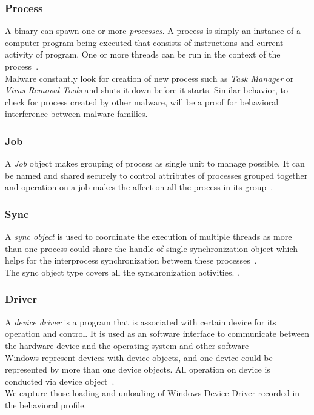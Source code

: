 \subsubsection{Process}
\label{ssub:Process}
A binary can spawn one or more \emph{processes}.
A process is simply an instance of a computer program being executed that consists of instructions and current activity of program.
One or more threads can be run in the context of the process~\cite[]{msprocess}.\\
Malware constantly look for creation of new process such as \emph{Task Manager} or \emph{Virus Removal Tools} and shuts it down before it starts.
Similar behavior, to check for process created by other malware, will be a proof for behavioral interference between malware families.
\subsubsection{Job}
\label{ssub:Job}
A \emph{Job} object makes grouping of process as single unit to manage possible.
It can be named and shared securely to control attributes of processes grouped together and operation on a job makes the affect on all the process in its group~\cite[]{msjob}.
\subsubsection{Sync}
\label{ssub:Sync}
A \emph{sync object} is used to coordinate the execution of multiple threads as more than one process could share the handle of single synchronization object which helps for the interprocess synchronization between these processes~\cite[]{mssync}.\\
The sync object type covers all the synchronization activities.
\cite[]{mssync}.
\subsubsection{Driver}
\label{ssub:Driver}
A \emph{device driver } is a program that is associated with certain device for its operation and control. It is used as an software interface to communicate between the hardware device and the operating system and other software~\cite[Device Driver]{devicedriver} \\
Windows represent devices with device objects, and one device could be represented by more than one device objects. All operation on device is conducted via device object~\cite[]{msdevice}.\\
We capture those loading and unloading of Windows Device Driver recorded in the behavioral profile.\\

